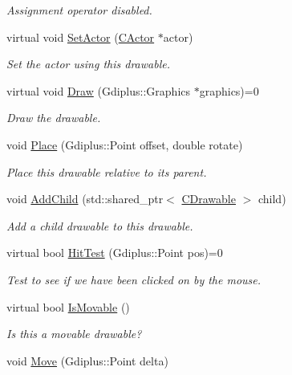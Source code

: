 \begin{DoxyCompactItemize}
\begin{DoxyCompactList}\small\item\em Assignment operator disabled. \end{DoxyCompactList}\item 
virtual void \hyperlink{class_c_drawable_a86762c6e220d9f502c6ccf9baf1135ac}{Set\+Actor} (\hyperlink{class_c_actor}{C\+Actor} $\ast$actor)
\begin{DoxyCompactList}\small\item\em Set the actor using this drawable. \end{DoxyCompactList}\item 
virtual void \hyperlink{class_c_drawable_a9b6a9920a75d88d9ae321997495eaec7}{Draw} (Gdiplus\+::\+Graphics $\ast$graphics)=0
\begin{DoxyCompactList}\small\item\em Draw the drawable. \end{DoxyCompactList}\item 
void \hyperlink{class_c_drawable_ac154be14313b739471d3a1529a2b31b5}{Place} (Gdiplus\+::\+Point offset, double rotate)
\begin{DoxyCompactList}\small\item\em Place this drawable relative to its parent. \end{DoxyCompactList}\item 
void \hyperlink{class_c_drawable_ab636167462699dde9b80e6dcb08caf7c}{Add\+Child} (std\+::shared\+\_\+ptr$<$ \hyperlink{class_c_drawable}{C\+Drawable} $>$ child)
\begin{DoxyCompactList}\small\item\em Add a child drawable to this drawable. \end{DoxyCompactList}\item 
virtual bool \hyperlink{class_c_drawable_a43490aec87b1209bbf7441e3855f0874}{Hit\+Test} (Gdiplus\+::\+Point pos)=0
\begin{DoxyCompactList}\small\item\em Test to see if we have been clicked on by the mouse. \end{DoxyCompactList}\item 
virtual bool \hyperlink{class_c_drawable_ac9f03cfc58aed75fb52cd69c71e7b6e0}{Is\+Movable} ()
\begin{DoxyCompactList}\small\item\em Is this a movable drawable? \end{DoxyCompactList}\item 
void \hyperlink{class_c_drawable_a2241b02a5f50c7a455283a9fb24d5b27}{Move} (Gdiplus\+::\+Point delta)

\end{DoxyCompactItemize}
